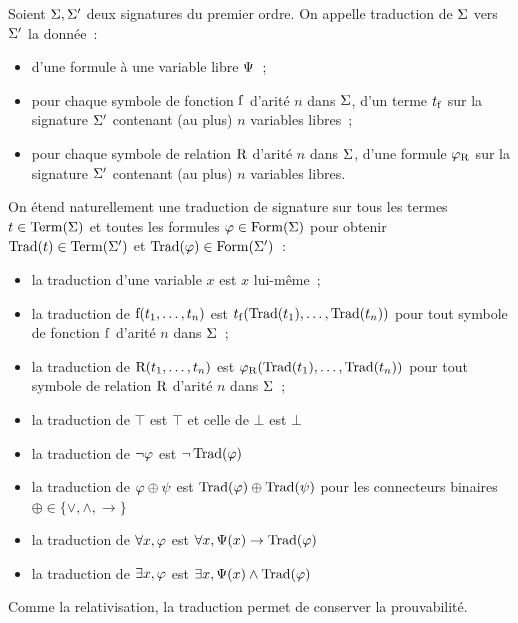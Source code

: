 \begin{definition}
  Soient $\Sigma,\Sigma'$ deux signatures du premier ordre. On appelle
  traduction de $\Sigma$ vers $\Sigma'$ la donnée~:
  \begin{itemize}
  \item d'une formule à une variable libre $\Psi$~;
  \item pour chaque symbole de fonction $\mathrm{f}$ d'arité $n$ dans $\Sigma$, d'un
    terme $t_{\mathrm{f}}$ sur la signature $\Sigma'$ contenant (au plus) $n$
    variables libres~;
  \item pour chaque symbole de relation $\mathrm{R}$ d'arité $n$ dans $\Sigma$, d'une
    formule $\varphi_{\mathrm{R}}$ sur la signature $\Sigma'$ contenant
    (au plus) $n$ variables libres.
  \end{itemize}

  On étend naturellement une traduction de signature sur tous les termes
  $t \in \operatorname{Term}(\Sigma)$ et toutes les formules $\varphi \in \operatorname{Form}(\Sigma)$
  pour obtenir $\operatorname{Trad}(t) \in \operatorname{Term}(\Sigma')$ et
  $\operatorname{Trad}(\varphi)\in\operatorname{Form}(\Sigma')$~:
  \begin{itemize}
  \item la traduction d'une variable $x$ est $x$ lui-même~;
  \item la traduction de $\mathrm{f}(t_1,\ldots,t_n)$ est
    $t_{\mathrm{f}}(\operatorname{Trad}(t_1),\ldots,\operatorname{Trad}(t_n))$
    pour tout symbole de fonction $\mathrm{f}$ d'arité $n$ dans $\Sigma$~;
  \item la traduction de $\mathrm{R}(t_1,\ldots,t_n)$ est
    $\varphi_{\mathrm{R}}(\operatorname{Trad}(t_1),\ldots,\operatorname{Trad}(t_n))$
    pour tout symbole de relation $\mathrm{R}$ d'arité $n$ dans $\Sigma$~;
  \item la traduction de $\top$ est $\top$ et celle de $\bot$ est $\bot$
  \item la traduction de $\lnot \varphi$ est $\lnot \operatorname{Trad}(\varphi)$
  \item la traduction de $\varphi \oplus \psi$ est
    $\operatorname{Trad}(\varphi)\oplus \operatorname{Trad}(\psi)$ pour les connecteurs binaires
    $\oplus\in \{\lor,\land,\to\}$
  \item la traduction de $\forall x, \varphi$ est
    $\forall x, \Psi(x) \to \operatorname{Trad}(\varphi)$
  \item la traduction de $\exists x, \varphi$ est
    $\exists x, \Psi(x) \land \operatorname{Trad}(\varphi)$
  \end{itemize}
\end{definition}

\noindent
Comme la relativisation, la traduction permet de conserver la prouvabilité.

